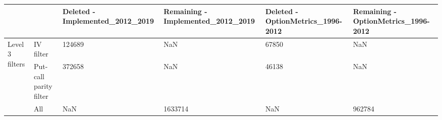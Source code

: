 \begin{tabular}{llllll}
\toprule
 &  & Deleted - Implemented_2012_2019 & Remaining - Implemented_2012_2019 & Deleted - OptionMetrics_1996-2012 & Remaining - OptionMetrics_1996-2012 \\
\midrule
\multirow[t]{3}{*}{Level 3 filters} & IV filter & 124689 & NaN & 67850 & NaN \\
 & Put-call parity filter & 372658 & NaN & 46138 & NaN \\
 & All & NaN & 1633714 & NaN & 962784 \\
\cline{1-6}
\bottomrule
\end{tabular}
